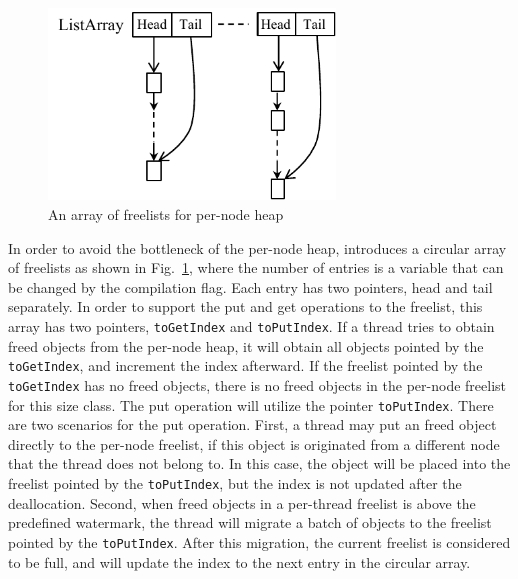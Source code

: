 \begin{figure}
\centering
\includegraphics[width=3in]{figure/listarray}
\vspace{-0.1in}
\caption{An array of freelists for per-node heap\label{fig:listarray}}
\vspace{-0.2in}
\end{figure}
In order to avoid the bottleneck of the per-node heap, \NM{} introduces a circular array of freelists as shown in Fig.~\ref{fig:listarray}, where the number of entries is a variable that can be changed by the compilation flag. Each entry has two pointers, head and tail separately. In order to support the put and get operations to the freelist, this array has two pointers, \texttt{toGetIndex} and  \texttt{toPutIndex}. If a thread tries to obtain freed objects from the per-node heap, it will obtain all  objects pointed by the \texttt{toGetIndex}, and increment the index afterward. If the freelist pointed by the \texttt{toGetIndex} has no freed objects, there is no freed objects in the per-node freelist for this size class.  The put operation will utilize the pointer \texttt{toPutIndex}. There are two scenarios for the put operation. First, a thread may put an freed object directly to the per-node freelist, if this object is originated from a different node that the thread does not belong to. In this case, the object will be placed into the freelist pointed by the \texttt{toPutIndex}, but the index is not updated after the deallocation. Second, when freed objects in a per-thread freelist is above the predefined watermark, the thread will migrate a batch of objects to the freelist pointed by the \texttt{toPutIndex}. After this migration, the current freelist is considered to be full, and will update the index to the next entry in the circular array.

   

 

